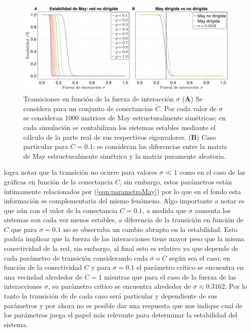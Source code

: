\begin{figure}[h!]
	\centering
	\includegraphics[scale = 0.165]{../Imagenes/TransicionMaySigma}
	\caption{Transiciones en función de la fuerza de interacción $\sigma$ (\textbf{A}) Se considera para un conjunto de conectancias $\tilde{C}$. Por cada valor de $\sigma$ se consideran 1000 matrices de May estructuralmente simétricas; en cada simulación se contabilizan los sistemas estables mediante el cálculo de la parte real de sus respectivos eigenvalores. (\textbf{B}) Caso particular para $C=0.1$; se consideran las diferencias entre la matriz de May estructuralmente simétrica y la matriz puramente aleatoria.}
	\label{fig:TransicionMaySigma}
\end{figure}
logra notar que la transición no ocurre para valores $\sigma\ll 1$ como en el caso de las gráficas en función de la conectancia $C$, sin embargo, estos parámetros están íntimamente relacionados por (\ref{eqn:parametroMay}) por lo que en el fondo esta información es complementaria del mismo fenómeno. Algo importante a notar es que aún con el valor de la conectancia $C=0.1$, a medida que $\sigma$ aumenta los sistemas son cada vez menos estables, a diferencia de la transición en función de $C$ que para $\sigma=0.1$ no se observaba un cambio abrupto en la estabilidad. Esto podría implicar que la fuerza de las interacciones tiene mayor peso que la misma conectividad de la red, sin embargo, al final esto es relativo ya que depende de cada parámetro de transición considerando cada $\sigma$ o $C$ según sea el caso; en función de la conectividad $C$ y para $\sigma=0.1$ el parámetro crítico se encuentra en una vecindad alrededor de $C=1$ mientras que para el caso de la fuerza de las interacciones $\sigma$, su parámetro crítico se encuentra alrededor de $\sigma\approx 0.3162$. Por lo tanto la transición de de cada caso será particular y dependiente de sus parámetros y por ahora no es posible dar una respuesta que nos indique cual de los parámetros juega el papel más relevante para determinar la estabilidad del sistema. 
